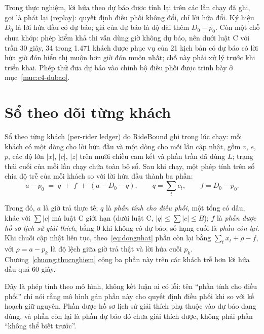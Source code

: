 Trong thực nghiệm, lời hứa theo dự báo được tính lại trên các lần chạy đã ghi, gọi là phát lại (replay):
quyết định điều phối không đổi, chỉ lời hứa đổi. Ký hiệu $D_0$ là lời hứa đầu có dự báo; giá của dự báo
là độ dài thêm $D_0 - p_0$. Còn một chỗ chưa khớp: phép kiểm khả thi vẫn dùng giờ không dự báo, nên dưới
luật C với trần 30 giây, 34 trong 1.471 khách được phục vụ của 21 kịch bản có dự báo có lời hứa giờ đón
hiển thị muộn hơn giờ đón muộn nhất; chỗ này phải xử lý trước khi triển khai. Phép thử đưa dự báo vào
chính bộ điều phối được trình bày ở mục~\ref{muc:c4-dubao}.

\section{Sổ theo dõi từng khách}
\label{muc:so}

Sổ theo từng khách (per-rider ledger) do RideBound ghi trong lúc chạy: mỗi khách có một dòng cho lời hứa
đầu và một dòng cho mỗi lần cập nhật, gồm $v$, $e$, $p$, các độ lớn $|x|$, $|c|$, $|z|$ trên mười chiều
cam kết và phần trần đã dùng $L$; trạng thái cuối của mỗi lần chạy chứa toàn bộ sổ. Sau khi chạy, một
phép tính trên sổ chia độ trễ của mỗi khách so với lời hứa đầu thành ba phần:
\begin{equation}
a - p_0 \;=\; q \;+\; f \;+\; (a - D_0 - q), \qquad q = \sum_{t} c_t, \qquad f = D_0 - p_0 .
\label{eq:so}
\end{equation}

Trong đó, $a$ là giờ trả thực tế; $q$ là \textit{phần tính cho điều phối}, một tổng có dấu, khác với
$\sum|c|$ mà luật C giới hạn (dưới luật C, $|q| \le \sum|c| \le B$); $f$ là \textit{phần được hồ sơ lịch
sử giải thích}, bằng 0 khi không có dự báo; số hạng cuối là \textit{phần còn lại}. Khi chuỗi cập nhật
liên tục, theo~\eqref{eq:dongnhat} phần còn lại bằng $\sum_t x_t + \rho - f$, với $\rho = a - p_k$ là độ
lệch giữa giờ trả thật và lời hứa cuối $p_k$. Chương~\ref{chuong:thucnghiem} cộng ba phần này trên các
khách trễ hơn lời hứa đầu quá 60 giây.

Đây là phép tính theo mô hình, không kết luận ai có lỗi: tên ``phần tính cho điều phối'' chỉ nói rằng mô
hình gán phần này cho quyết định điều phối khi so với kế hoạch giữ nguyên. Phần được hồ sơ lịch sử giải
thích phụ thuộc vào dự báo đang dùng, và phần còn lại là phần dự báo đó chưa giải thích được, không phải
phần ``không thể biết trước''.

